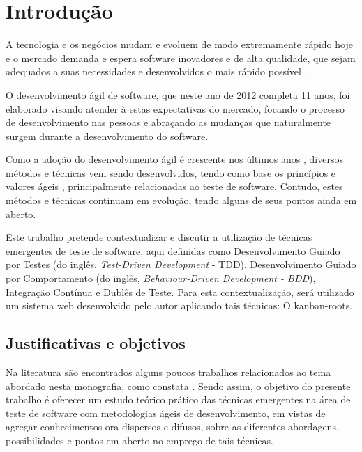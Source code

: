 \chapter{Introdução}

A tecnologia e os negócios mudam e evoluem de modo extremamente rápido hoje e o mercado demanda e espera software inovadores e de alta qualidade, que sejam adequados a suas necessidades e desenvolvidos o mais rápido possível \cite{TheBusinessOfInnovation}.

O desenvolvimento ágil de software, que neste ano de 2012 completa 11 anos, foi elaborado \cite{AgileManifesto} visando atender à estas expectativas do mercado, focando o processo de desenvolvimento nas pessoas e abraçando as mudanças que naturalmente surgem durante a desenvolvimento do software.

Como a adoção do desenvolvimento ágil é crescente nos últimos anos \cite{ResumoChaosReport}, diversos métodos e técnicas vem sendo desenvolvidos, tendo como base os princípios e valores ágeis \cite{BDDRodrigo}, principalmente relacionadas ao teste de software. Contudo, estes métodos e técnicas continuam em evolução, tendo alguns de seus pontos ainda em aberto.

Este trabalho pretende contextualizar e discutir a utilização de técnicas emergentes de teste de software, aqui definidas como Desenvolvimento Guiado por Testes (do inglês, \textit{Test-Driven Development} - TDD), Desenvolvimento Guiado por Comportamento (do inglês, \textit{Behaviour-Driven Development - BDD}), Integração Contínua e Dublês de Teste. Para esta contextualização, será utilizado um sistema web desenvolvido pelo autor aplicando tais técnicas: O kanban-roots.

\section{Justificativas e objetivos}

Na literatura são encontrados alguns poucos trabalhos relacionados ao tema abordado nesta monografia, como constata . Sendo assim, o objetivo do presente trabalho é oferecer um estudo teórico prático das técnicas emergentes na área de teste de software com metodologias ágeis de desenvolvimento, em vistas de agregar conhecimentos ora dispersos e difusos, sobre as diferentes abordagens, possibilidades e pontos em aberto no emprego de tais técnicas.

